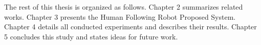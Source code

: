The rest of this thesis is organized as follows.
Chapter 2 summarizes related works.
Chapter 3 presents the Human Following Robot Proposed System.
Chapter 4 details all conducted experiments and describes their results.
Chapter 5 concludes this study and states ideas for future work.



